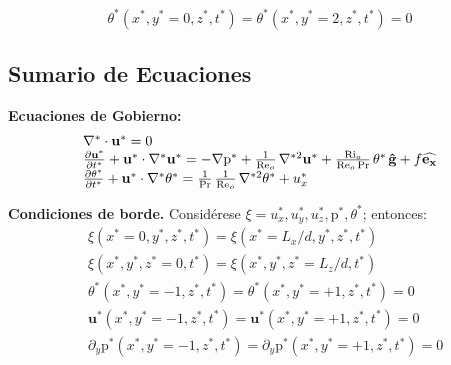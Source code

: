 \begin{equation}
\theta^*(x^*,y^*=0,z^*,t^*) = \theta^*(x^*,y^*=2,z^*,t^*) = 0
\label{eq:dirichlet_adim_theta}
\end{equation}



\subsection{Sumario de Ecuaciones}

\textbf{Ecuaciones de Gobierno:}
\begin{equation}
\begin{array}{l}
    \nabla^* \cdot \mathbf{u^*} = 0 \\
    \frac{\partial \mathbf{u^*}}{\partial t^*} + \mathbf{u^*} \cdot \nabla^* \mathbf{u^*} = 
    -\nabla \text{p}^* + \frac{1}{\text{Re}_o} \hspace{0.5mm} \nabla^{*2} \mathbf{u^*} + \frac{\text{Ri}_o}{\text{Re}_o \hspace{0.5mm} \text{Pr}} \hspace{0.5mm} \theta^* \hspace{0.5mm} \mathbf{\hat{g}} + f \mathbf{\widehat{e_x}}  \\
    \frac{\partial \theta^*}{\partial t^*} + \mathbf{u^*} \cdot \nabla^* \theta^* = 
    \frac{1}{\text{Pr}}\hspace{0.5mm}  \frac{1}{\text{Re}_o} \hspace{0.5mm} \nabla^{*2} \theta^* + u_x^* 
\end{array}
\label{eq:gob_system_res1}
\end{equation}

\textbf{Condiciones de borde.} Considérese $\xi= u^*_x, u^*_y, u^*_z, \text{p}^*, \theta^*$; entonces:
\begin{align}
&\xi(x^*=0,y^*,z^*,t^*) = \xi(x^*=L_x/d,y^*,z^*,t^*) 
	\label{eq:bc_1} \\
&\xi(x^*,y^*,z^*=0,t^*) = \xi(x^*,y^*,z^*=L_z/d,t^*) 
	\label{eq:bc_2} \\
&\theta^*(x^*,y^*=-1,z^*,t^*)       = \theta^*(x^*,y^*=+1,z^*,t^*) = 0
	\label{eq:bc_3} \\
&\mathbf{u^*}(x^*,y^*=-1,z^*,t^*)   = \mathbf{u^*}(x^*,y^*=+1,z^*,t^*) = 0
	\label{eq:bc_4} \\
&\partial_y \text{p}^*(x^*,y^*=-1,z^*,t^*) = \partial_y \text{p}^*(x^*,y^*=+1,z^*,t^*) = 0
	\label{eq:bc_5}
\end{align}


